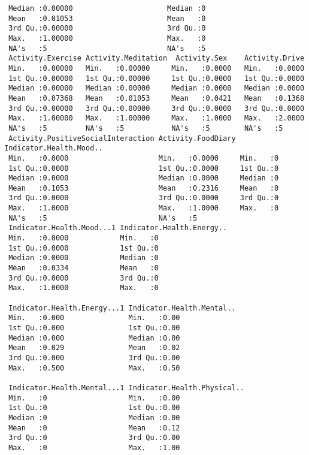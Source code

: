 \documentclass[11pt]{article}
\begin{document}
\begin{verbatim}
 Median :0.00000                      Median :0                 
 Mean   :0.01053                      Mean   :0                 
 3rd Qu.:0.00000                      3rd Qu.:0                 
 Max.   :1.00000                      Max.   :0                 
 NA's   :5                            NA's   :5                 
 Activity.Exercise Activity.Meditation  Activity.Sex    Activity.Drive  
 Min.   :0.00000   Min.   :0.00000     Min.   :0.0000   Min.   :0.0000  
 1st Qu.:0.00000   1st Qu.:0.00000     1st Qu.:0.0000   1st Qu.:0.0000  
 Median :0.00000   Median :0.00000     Median :0.0000   Median :0.0000  
 Mean   :0.07368   Mean   :0.01053     Mean   :0.0421   Mean   :0.1368  
 3rd Qu.:0.00000   3rd Qu.:0.00000     3rd Qu.:0.0000   3rd Qu.:0.0000  
 Max.   :1.00000   Max.   :1.00000     Max.   :1.0000   Max.   :2.0000  
 NA's   :5         NA's   :5           NA's   :5        NA's   :5       
 Activity.PositiveSocialInteraction Activity.FoodDiary Indicator.Health.Mood..
 Min.   :0.0000                     Min.   :0.0000     Min.   :0              
 1st Qu.:0.0000                     1st Qu.:0.0000     1st Qu.:0              
 Median :0.0000                     Median :0.0000     Median :0              
 Mean   :0.1053                     Mean   :0.2316     Mean   :0              
 3rd Qu.:0.0000                     3rd Qu.:0.0000     3rd Qu.:0              
 Max.   :1.0000                     Max.   :1.0000     Max.   :0              
 NA's   :5                          NA's   :5                                 
 Indicator.Health.Mood...1 Indicator.Health.Energy..
 Min.   :0.0000            Min.   :0                
 1st Qu.:0.0000            1st Qu.:0                
 Median :0.0000            Median :0                
 Mean   :0.0334            Mean   :0                
 3rd Qu.:0.0000            3rd Qu.:0                
 Max.   :1.0000            Max.   :0                
                                                    
 Indicator.Health.Energy...1 Indicator.Health.Mental..
 Min.   :0.000               Min.   :0.00             
 1st Qu.:0.000               1st Qu.:0.00             
 Median :0.000               Median :0.00             
 Mean   :0.029               Mean   :0.02             
 3rd Qu.:0.000               3rd Qu.:0.00             
 Max.   :0.500               Max.   :0.50             
                                                      
 Indicator.Health.Mental...1 Indicator.Health.Physical..
 Min.   :0                   Min.   :0.00               
 1st Qu.:0                   1st Qu.:0.00               
 Median :0                   Median :0.00               
 Mean   :0                   Mean   :0.12               
 3rd Qu.:0                   3rd Qu.:0.00               
 Max.   :0                   Max.   :1.00               
                                                        

\end{verbatim}
\end{document}
